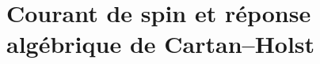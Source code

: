 %

\section{Courant de spin et réponse algébrique de Cartan--Holst}
\label{vii:sec:corriente-respuesta-cartan}

